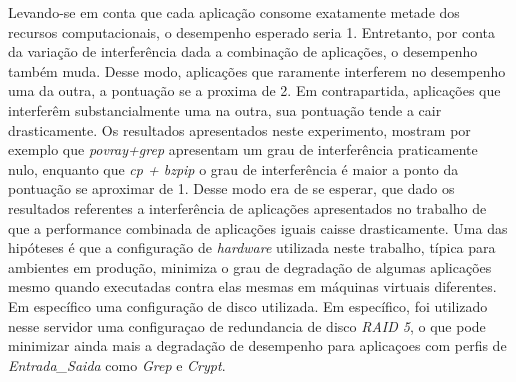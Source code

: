 Levando-se em conta que cada aplicação consome exatamente metade dos recursos computacionais, o desempenho esperado seria 1. Entretanto, por conta da variação de interferência dada a combinação de aplicações, o desempenho também muda. Desse modo, aplicações que raramente interferem no desempenho uma da outra, a pontuação se a proxima de 2. Em contrapartida, aplicações que interferêm substancialmente uma na outra, sua pontuação tende a cair drasticamente. Os resultados apresentados neste experimento, mostram por exemplo que \textit{povray+grep} apresentam um grau de interferência praticamente nulo, enquanto que \textit{cp + bzpip} o grau de interferência é maior a ponto da pontuação se aproximar de 1. Desse modo era de se esperar, que dado os resultados referentes a interferência de aplicações apresentados no trabalho de  que a performance combinada de aplicações iguais caisse drasticamente. Uma das hipóteses é que a configuração de \textit{hardware} utilizada neste trabalho, típica para ambientes em produção, minimiza o grau de degradação de algumas aplicações mesmo quando executadas contra elas mesmas em máquinas virtuais diferentes. Em específico uma configuração de disco utilizada. Em específico, foi utilizado nesse servidor uma configuraçao de redundancia de disco \textit{RAID 5}, o que pode minimizar ainda mais a degradação de desempenho para aplicaçoes com perfis de \textit{Entrada\_Saida} como \textit{Grep} e \textit{Crypt}.  %

  

